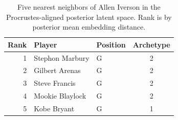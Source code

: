 \begin{table}[htbp]
  \centering\small
  \begin{tabular}{rllc}
    \toprule
    Rank & Player & Position & Archetype \\
    \midrule
    1 & Stephon Marbury & G & 2 \\
    2 & Gilbert Arenas & G & 2 \\
    3 & Steve Francis & G & 2 \\
    4 & Mookie Blaylock & G & 2 \\
    5 & Kobe Bryant & G & 1 \\
    \bottomrule
  \end{tabular}
  \caption{Five nearest neighbors of Allen Iverson in the Procrustes-aligned posterior latent space. Rank is by posterior mean embedding distance.}
  \label{tab:Allen_Iverson_neighbors}
\end{table}

